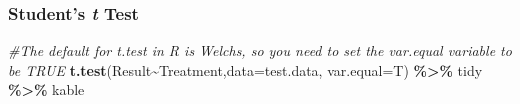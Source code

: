 \documentclass[
]{article}
\newenvironment{Shaded}{\begin{snugshade}}{\end{snugshade}}
\newcommand{\AttributeTok}[1]{\textcolor[rgb]{0.13,0.29,0.53}{#1}}
\newcommand{\CommentTok}[1]{\textcolor[rgb]{0.56,0.35,0.01}{\textit{#1}}}
\newcommand{\FunctionTok}[1]{\textcolor[rgb]{0.13,0.29,0.53}{\textbf{#1}}}
\newcommand{\NormalTok}[1]{#1}
\newcommand{\SpecialCharTok}[1]{\textcolor[rgb]{0.81,0.36,0.00}{\textbf{#1}}}
\begin{document}
\subsubsection{\texorpdfstring{Student's \emph{t}
Test}{Student's t Test}}\label{students-t-test}

\begin{Shaded}
\begin{Highlighting}[]
\CommentTok{\#The default for t.test in R is Welch\textquotesingle{}s, so you need to set the var.equal variable to be TRUE}
\FunctionTok{t.test}\NormalTok{(Result}\SpecialCharTok{\textasciitilde{}}\NormalTok{Treatment,}\AttributeTok{data=}\NormalTok{test.data, }\AttributeTok{var.equal=}\NormalTok{T) }\SpecialCharTok{\%\textgreater{}\%}\NormalTok{ tidy }\SpecialCharTok{\%\textgreater{}\%}\NormalTok{ kable}
\end{Highlighting}
\end{Shaded}
\end{document}
